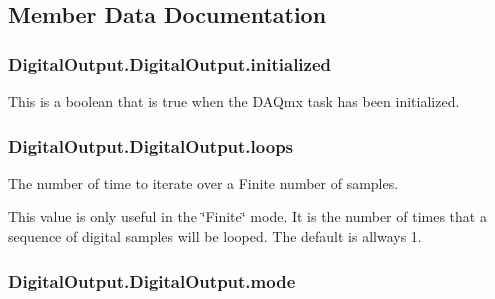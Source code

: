 \subsection{Member Data Documentation}
\hypertarget{class_digital_output_1_1_digital_output_af5c9fe7d592b5bcbd98ce90afc678fdc}{
\subsubsection[{initialized}]{\setlength{\rightskip}{0pt plus 5cm}Digital\-Output.\-Digital\-Output.\-initialized}}\label{class_digital_output_1_1_digital_output_af5c9fe7d592b5bcbd98ce90afc678fdc}


This is a boolean that is true when the D\-A\-Qmx task has been initialized. 

\hypertarget{class_digital_output_1_1_digital_output_a352162e0da3e40979267c4263b726ead}{
\subsubsection[{loops}]{\setlength{\rightskip}{0pt plus 5cm}Digital\-Output.\-Digital\-Output.\-loops}}\label{class_digital_output_1_1_digital_output_a352162e0da3e40979267c4263b726ead}


The number of time to iterate over a Finite number of samples. 

This value is only useful in the \char`\"{}\-Finite\char`\"{} mode. It is the number of times that a sequence of digital samples will be looped. The default is allways 1. \hypertarget{class_digital_output_1_1_digital_output_a68b531bfedc4aa2fd7e54c24d2b9758e}{
\subsubsection[{mode}]{\setlength{\rightskip}{0pt plus 5cm}Digital\-Output.\-Digital\-Output.\-mode}}\label{class_digital_output_1_1_digital_output_a68b531bfedc4aa2fd7e54c24d2b9758e}


